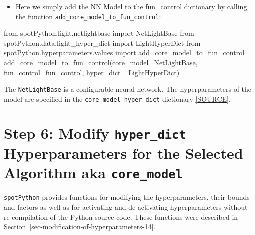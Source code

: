 \documentclass[
  letterpaper,
  DIV=11,
  numbers=noendperiod]{scrreprt}
\newenvironment{Shaded}{\begin{snugshade}}{\end{snugshade}}
\newcommand{\ImportTok}[1]{\textcolor[rgb]{0.00,0.46,0.62}{#1}}
\newcommand{\NormalTok}[1]{\textcolor[rgb]{0.00,0.23,0.31}{#1}}
\newcommand{\OperatorTok}[1]{\textcolor[rgb]{0.37,0.37,0.37}{#1}}
\providecommand{\tightlist}{%
  \setlength{\itemsep}{0pt}\setlength{\parskip}{0pt}}\usepackage{longtable,booktabs,array}
\begin{document}
\begin{itemize}
\tightlist
\item
  Here we simply add the NN Model to the fun\_control dictionary by
  calling the function \texttt{add\_core\_model\_to\_fun\_control}:
\end{itemize}

\begin{Shaded}
\begin{Highlighting}[]
\ImportTok{from}\NormalTok{ spotPython.light.netlightbase }\ImportTok{import}\NormalTok{ NetLightBase }
\ImportTok{from}\NormalTok{ spotPython.data.light\_hyper\_dict }\ImportTok{import}\NormalTok{ LightHyperDict}
\ImportTok{from}\NormalTok{ spotPython.hyperparameters.values }\ImportTok{import}\NormalTok{ add\_core\_model\_to\_fun\_control}
\NormalTok{add\_core\_model\_to\_fun\_control(core\_model}\OperatorTok{=}\NormalTok{NetLightBase,}
\NormalTok{                              fun\_control}\OperatorTok{=}\NormalTok{fun\_control,}
\NormalTok{                              hyper\_dict}\OperatorTok{=}\NormalTok{ LightHyperDict)}
\end{Highlighting}
\end{Shaded}

The \texttt{NetLightBase} is a configurable neural network. The
hyperparameters of the model are specified in the
\texttt{core\_model\_hyper\_dict} dictionary
\href{https://github.com/sequential-parameter-optimization/spotPython/blob/main/src/spotPython/data/light_hyper_dict.json}{{[}SOURCE{]}}.

\hypertarget{sec-modification-of-hyperparameters-31}{%
\section{\texorpdfstring{Step 6: Modify \texttt{hyper\_dict}
Hyperparameters for the Selected Algorithm aka
\texttt{core\_model}}{Step 6: Modify hyper\_dict Hyperparameters for the Selected Algorithm aka core\_model}}\label{sec-modification-of-hyperparameters-31}}

\texttt{spotPython} provides functions for modifying the
hyperparameters, their bounds and factors as well as for activating and
de-activating hyperparameters without re-compilation of the Python
source code. These functions were described in
Section~\ref{sec-modification-of-hyperparameters-14}.
\end{document}
